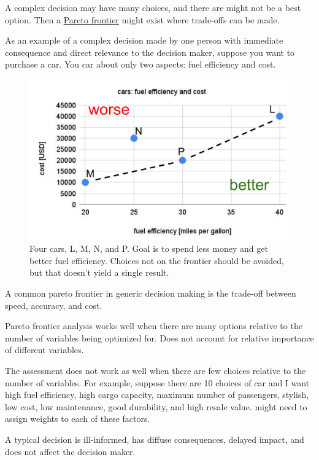 A complex decision may have many choices, and there are might not be a best option. Then a \href{https://en.wikipedia.org/wiki/Pareto_front}{Pareto frontier} might exist where trade-offs can be made. 

As an example of a complex decision made by one person with immediate consequence and direct relevance to the decision maker, suppose you want to purchase a car. You car about only two aspects: fuel efficiency and cost. 

\begin{figure}[ht]
    \centering
    \includegraphics[width=1\textwidth]{images/pareto_frontier_car_options.pdf}
    \caption{Four cars, L, M, N, and P. Goal is to spend less money and get better fuel efficiency. Choices not on the frontier should be avoided, but that doesn't yield a single result.}
    \label{fig:pareto_frontier_cars}
\end{figure}

A common pareto frontier in generic decision making is the trade-off between speed, accuracy, and cost. 

Pareto frontier analysis works well when there are many options relative to the number of variables being optimized for. Does not account for relative importance of different variables.

The assessment does not work as well when there are few choices relative to the number of variables. For example, suppose there are 10 choices of car and I want high fuel efficiency, high cargo capacity, maximum number of passengers, stylish, low cost, low maintenance, good durability, and high resale value. might need to assign weights to each of these factors. 

A typical decision is ill-informed, has diffuse consequences, delayed impact, and does not affect the decision maker. 

